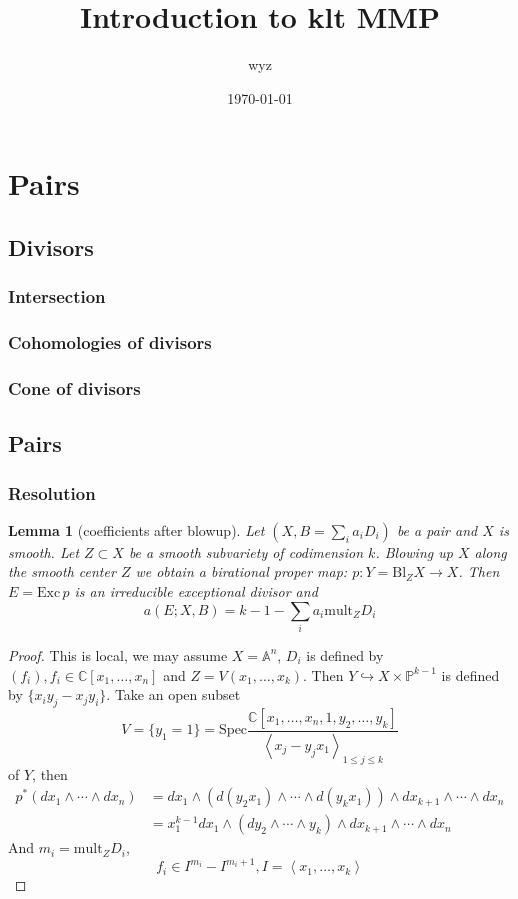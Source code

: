 \documentclass{article}
\title{Introduction to klt MMP}
\author{wyz}
\date{\today}
\newtheorem{lem}[defn]{Lemma}
\begin{document}
\maketitle
\section{Pairs}
\subsection{Divisors}
\subsubsection{Intersection}
\subsubsection{Cohomologies of divisors}
\subsubsection{Cone of divisors}
\subsection{Pairs}
\subsubsection{Resolution}

\begin{lem}[coefficients after blowup]
  Let $ (X,B=\sum_i a_i D_i) $ be a pair and $ X $ is smooth. Let $ Z\subset X $ be a smooth subvariety of codimension $ k $. Blowing up  $ X $ along the smooth center $ Z $ we obtain a birational proper map: $ p:Y=\mathrm{Bl}_ZX\to X $. Then $ E=\mathrm{Exc}\, p $ is an irreducible exceptional divisor and
  \[ a(E;X,B)=k-1-\sum_ia_i\mathrm{mult}_ZD_i \]
\end{lem}
\begin{proof}
  This is local, we may assume $ X=\mathbb{A}^n $, $ D_i $ is defined by $ (f_i),f_i\in \mathbb{C}[x_1,\ldots,x_n] $ and $ Z=V(x_1,\ldots,x_{k}) $. Then $ Y\hookrightarrow X\times \mathbb{P}^{k-1} $ is defined by $ \{ x_iy_j-x_jy_i\} $. Take an open subset
  \[ V=\{ y_1=1 \} =\mathrm{Spec}\frac{\mathbb{C}[x_1,\ldots,x_n,1,y_2,\ldots,y_k]}{\left <x_j-y_jx_1 \right >_{1\leqslant j\leqslant k}}\]
  of $ Y $, then
  \begin{equation*}
    \begin{aligned}
      p^*(dx_1\wedge\cdots\wedge dx_n) & =dx_1\wedge (d(y_2x_1)\wedge\cdots\wedge d(y_kx_1))\wedge dx_{k+1}\wedge\cdots\wedge dx_n \\
                                       & =x_1^{k-1}dx_1\wedge (dy_2\wedge\cdots\wedge y_k)\wedge dx_{k+1}\wedge\cdots\wedge dx_n
    \end{aligned}
  \end{equation*}
  And $ m_i=\mathrm{mult}_ZD_i $,
  \[
    f_i\in I^{m_i}-I^{m_i+1}, I=\left <x_1,\ldots,x_k\right >
  \]
\end{proof}
\end{document}
